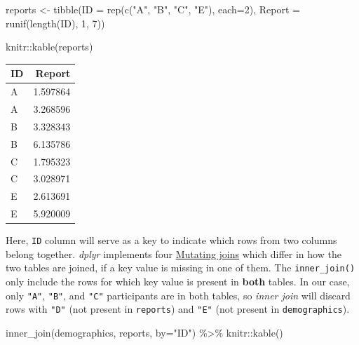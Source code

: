 \documentclass[
]{book}
\newenvironment{Shaded}{\begin{snugshade}}{\end{snugshade}}
\newcommand{\AttributeTok}[1]{\textcolor[rgb]{0.77,0.63,0.00}{#1}}
\newcommand{\DecValTok}[1]{\textcolor[rgb]{0.00,0.00,0.81}{#1}}
\newcommand{\FunctionTok}[1]{\textcolor[rgb]{0.00,0.00,0.00}{#1}}
\newcommand{\NormalTok}[1]{#1}
\newcommand{\OtherTok}[1]{\textcolor[rgb]{0.56,0.35,0.01}{#1}}
\newcommand{\SpecialCharTok}[1]{\textcolor[rgb]{0.00,0.00,0.00}{#1}}
\newcommand{\StringTok}[1]{\textcolor[rgb]{0.31,0.60,0.02}{#1}}
\begin{document}
\begin{Shaded}
\begin{Highlighting}[]
\NormalTok{reports }\OtherTok{\textless{}{-}} \FunctionTok{tibble}\NormalTok{(}\AttributeTok{ID =} \FunctionTok{rep}\NormalTok{(}\FunctionTok{c}\NormalTok{(}\StringTok{"A"}\NormalTok{, }\StringTok{"B"}\NormalTok{, }\StringTok{"C"}\NormalTok{, }\StringTok{"E"}\NormalTok{), }\AttributeTok{each=}\DecValTok{2}\NormalTok{),}
                  \AttributeTok{Report =} \FunctionTok{runif}\NormalTok{(}\FunctionTok{length}\NormalTok{(ID), }\DecValTok{1}\NormalTok{, }\DecValTok{7}\NormalTok{))}

\NormalTok{knitr}\SpecialCharTok{::}\FunctionTok{kable}\NormalTok{(reports)}
\end{Highlighting}
\end{Shaded}

\begin{tabular}{l|r}
\hline
ID & Report\\
\hline
A & 1.597864\\
\hline
A & 3.268596\\
\hline
B & 3.328343\\
\hline
B & 6.135786\\
\hline
C & 1.795323\\
\hline
C & 3.028971\\
\hline
E & 2.613691\\
\hline
E & 5.920009\\
\hline
\end{tabular}

Here, \texttt{ID} column will serve as a key to indicate which rows from two columns belong together. \emph{dplyr} implements four \href{https://dplyr.tidyverse.org/reference/mutate-joins.html}{Mutating joins} which differ in how the two tables are joined, if a key value is missing in one of them. The \texttt{inner\_join()} only include the rows for which key value is present in \textbf{both} tables. In our case, only \texttt{"A"}, \texttt{"B"}, and \texttt{"C"} participants are in both tables, so \emph{inner join} will discard rows with \texttt{"D"} (not present in \texttt{reports}) and \texttt{"E"} (not present in \texttt{demographics}).

\begin{Shaded}
\begin{Highlighting}[]
\FunctionTok{inner\_join}\NormalTok{(demographics, reports, }\AttributeTok{by=}\StringTok{"ID"}\NormalTok{) }\SpecialCharTok{\%\textgreater{}\%}
\NormalTok{  knitr}\SpecialCharTok{::}\FunctionTok{kable}\NormalTok{()}
\end{Highlighting}
\end{Shaded}
\end{document}
